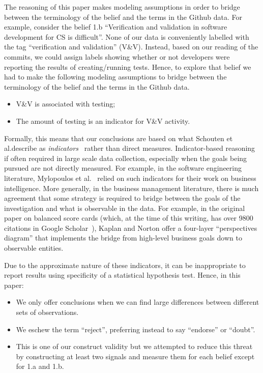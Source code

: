 \documentclass[sigconf,review,anonymous]{acmart}
\newcommand{\bi}{\begin{itemize}}
\newcommand{\ei}{\end{itemize}}
\begin{document}
The reasoning of this 
paper makes
modeling assumptions in order to bridge between the terminology of the belief
 and the terms in the Github data.   For example, consider the belief 1.b ``Verification and validation in software development for CS is difficult''.   
 None of our data is conveniently labelled with the tag ``verification and validation'' (V\&V).  Instead, based on our reading of the commits, we could assign labels showing whether or not developers were reporting the results of creating/running tests. Hence, to explore that belief we had to make the following modeling assumptions to bridge between the terminology of the belief and the terms in the Github data.
 \bi
 \item V\&V is associated with testing;
 \item The amount of testing is an indicator for  V\&V activity.
 \ei
 Formally, this means that our conclusions are based  on what
 Schouten et al.describe as
  {\em indicators}~\cite{schouten2010indicators} rather than direct measures. Indicator-based reasoning
  if often required in   large scale data collection, especially
  when the   goals being pursued
  are not   directly
  measured. 
  For example, in the software engineering literature, 
  Mylopoulos et al.~\cite{barone2011composite} relied on such indicators for their work on business intelligence.
  More generally, in the business 
  management literature, there is much agreement that some strategy is required
  to bridge between the goals of the investigation and what is observable in the data. 
  For example, in the original paper on balanced score cards (which, at the time of this
  writing,  has over 9800 citations in Google Scholar~\cite{kaplan1996using}),
  Kaplan and Norton offer a four-layer ``perspectives diagram'' that implements the bridge from high-level business goals down
  to observable entities.
  
  Due to the approximate
  nature of these indicators, it can
  be inappropriate to report results using
  specificity of a statistical
  hypothesis test. 
 Hence, in this
  paper:
  \bi
  \item We only offer conclusions when
  we can find large differences between different sets of observations.
  \item
  We eschew the term ``reject'',
  preferring instead to say
  ``endorse'' or ``doubt''.
  \item This is one of our construct validity but we attempted to reduce this threat by constructing at least two signals and measure them for each belief except for 1.a and 1.b.
\ei
\end{document}
